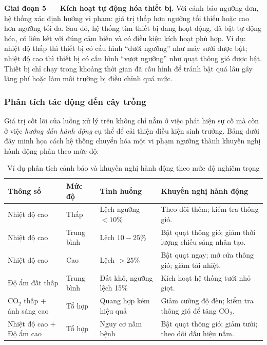 \documentclass[13pt,a4paper]{extarticle}
\numberwithin{figure}{section}
\numberwithin{table}{section}
\begin{document}
	\textbf{Giai đoạn 5 --- Kích hoạt tự động hóa thiết bị.} Với cảnh báo ngưỡng đơn, hệ thống xác định hướng vi phạm: giá trị thấp hơn ngưỡng tối thiểu hoặc cao hơn ngưỡng tối đa. Sau đó, hệ thống tìm thiết bị đang hoạt động, đã bật tự động hóa, có liên kết với đúng cảm biến và có điều kiện kích hoạt phù hợp. Ví dụ: nhiệt độ thấp thì thiết bị có cấu hình ``dưới ngưỡng'' như máy sưởi được bật; nhiệt độ cao thì thiết bị có cấu hình ``vượt ngưỡng'' như quạt thông gió được bật. Thiết bị chỉ chạy trong khoảng thời gian đã cấu hình để tránh bật quá lâu gây lãng phí hoặc làm môi trường bị điều chỉnh quá mức.
	
	\subsubsection{Phân tích tác động đến cây trồng}
	
	Giá trị cốt lõi của luồng xử lý trên không chỉ nằm ở việc phát hiện sự cố mà còn ở việc \textit{hướng dẫn hành động} cụ thể để cải thiện điều kiện sinh trưởng. Bảng dưới đây minh họa cách hệ thống chuyển hóa một vi phạm ngưỡng thành khuyến nghị hành động phân theo mức độ:
	
	\begin{table}[H]
		\centering
		\caption{Ví dụ phân tích cảnh báo và khuyến nghị hành động theo mức độ nghiêm trọng}
		\label{tab:alert-action}
		\begin{tabular}{|p{2.5cm}|p{2cm}|p{4cm}|p{5.5cm}|}
			\hline
			\textbf{Thông số} & \textbf{Mức độ} & \textbf{Tình huống} & \textbf{Khuyến nghị hành động} \\
			\hline
			Nhiệt độ cao & Thấp & Lệch ngưỡng $< 10\%$ & Theo dõi thêm; kiểm tra thông gió. \\
			\hline
			Nhiệt độ cao & Trung bình & Lệch $10-25\%$ & Bật quạt thông gió; giảm thời lượng chiếu sáng nhân tạo. \\
			\hline
			Nhiệt độ cao & Cao & Lệch $> 25\%$ & Bật quạt ngay; mở cửa thông gió; giảm tải nhiệt. \\
			\hline
			Độ ẩm đất thấp & Trung bình & Đất khô, ngưỡng lệch 15\% & Kích hoạt hệ thống tưới nhỏ giọt. \\
			\hline
			CO$_2$ thấp + ánh sáng cao & Tổ hợp & Quang hợp kém hiệu quả & Giảm cường độ đèn; kiểm tra thông gió để tăng CO$_2$. \\
			\hline
			Nhiệt độ cao + Độ ẩm cao & Tổ hợp & Nguy cơ nấm bệnh & Bật quạt thông gió; giảm tưới; theo dõi dấu hiệu nấm. \\
			\hline
		\end{tabular}
	\end{table}
	
\end{document}
